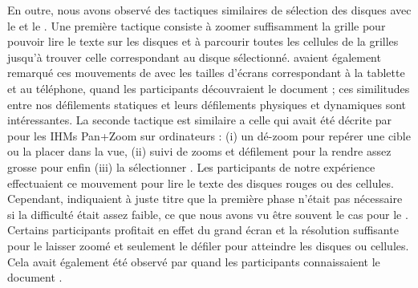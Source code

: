 
En outre, nous avons observé des tactiques similaires de sélection des disques avec le  et le . Une première tactique consiste à zoomer suffisamment la grille pour pouvoir lire le texte sur les disques et à parcourir toutes les cellules de la grilles jusqu'à trouver celle correspondant au disque sélectionné. \cite{Raedle2014} avaient également remarqué ces mouvements de   avec les tailles d'écrans correspondant à la tablette et au téléphone, quand les participants découvraient le document ; ces similitudes entre nos défilements statiques et leurs défilements physiques et dynamiques sont intéressantes. La seconde tactique est similaire a celle qui avait été décrite par \cite{Guiard2004} pour les IHMs Pan+Zoom sur ordinateurs : (i) un dé-zoom pour repérer une cible ou la placer dans la vue, (ii) suivi de zooms et défilement pour la rendre assez grosse pour enfin (iii) la sélectionner . Les participants de notre expérience effectuaient ce mouvement pour lire le texte des disques rouges ou des cellules. Cependant, \cite{Guiard2004} indiquaient à juste titre que la première phase n'était pas nécessaire si la difficulté était assez faible, ce que nous avons vu être souvent le cas pour le . Certains participants profitait en effet du grand écran et la résolution suffisante pour le laisser zoomé et seulement le défiler pour atteindre les disques ou cellules. Cela avait également été observé par \cite{Raedle2014} quand les participants connaissaient le document .


